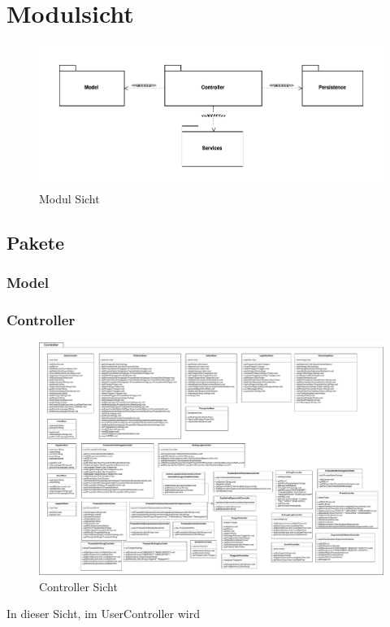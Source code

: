 \documentclass[enabledeprecatedfontcommands,fontsize=12pt,paper=a4,twoside]{scrartcl}
\begin{document}
\section{Modulsicht}

\label{sec:modulsicht}
\begin{figure}[H]
\begin{center}
 \includegraphics[width=\textwidth]{UML/Modulsicht.png}
  \caption{Modul Sicht}
  \label{fig:boat1}
\end{center}
\end{figure}
\subsection{Pakete}

\subsubsection{Model}

\subsubsection{Controller}

\begin{figure} 
\begin{center}
 \includegraphics[width=\textwidth]{UML/Controller.pdf}
  \caption{Controller Sicht}
  \label{fig:boat1}
\end{center}
\end{figure}
\newpage
In dieser Sicht, im UserController wird 
\end{document}
